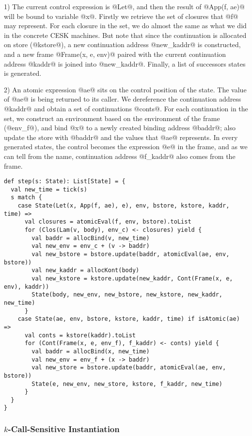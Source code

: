 \documentclass[acmsmall,review,anonymous]{acmart}\settopmatter{printfolios=true,printccs=false,printacmref=false}
\begin{document}
1) The current control expression is @Let@,
and then the result of @App(f, ae)@ will be bound to variable @x@.
Firstly we retrieve the set of closures that @f@ may represent.
For each closure in the set, we do almost the same as what we did in the concrete
CESK machines. But note that since the continuation is allocated on store (@kstore@),
a new continuation address @new_kaddr@ is constructed, and a new frame
@Frame(x, e, env)@ paired with the current continuation address @kaddr@
is joined into @new_kaddr@. Finally, a list of successors states is generated.

2) An atomic expression @ae@ sits on the control position of the state.
The value of @ae@ is being returned to its caller.
We dereference the continuation address @kaddr@ and obtain a set of
continuations @conts@.
For each continuation in the set, we construct an environment based on the
environment of the frame (@env_f@), and bind @x@ to a newly created binding
address @baddr@; also update the store with @baddr@ and
the values that @ae@ represents. In every generated states,
the control becomes the expression @e@ in the frame,
and as we can tell from the name, continuation address @f_kaddr@
also comes from the frame.

\begin{lstlisting}
def step(s: State): List[State] = {
  val new_time = tick(s)
  s match {
    case State(Let(x, App(f, ae), e), env, bstore, kstore, kaddr, time) =>
      val closures = atomicEval(f, env, bstore).toList
      for (Clos(Lam(v, body), env_c) <- closures) yield {
        val baddr = allocBind(v, new_time)
        val new_env = env_c + (v -> baddr)
        val new_bstore = bstore.update(baddr, atomicEval(ae, env, bstore))
        val new_kaddr = allocKont(body)
        val new_kstore = kstore.update(new_kaddr, Cont(Frame(x, e, env), kaddr))
        State(body, new_env, new_bstore, new_kstore, new_kaddr, new_time)
      }
    case State(ae, env, bstore, kstore, kaddr, time) if isAtomic(ae) =>
      val conts = kstore(kaddr).toList
      for (Cont(Frame(x, e, env_f), f_kaddr) <- conts) yield {
        val baddr = allocBind(x, new_time)
        val new_env = env_f + (x -> baddr)
        val new_store = bstore.update(baddr, atomicEval(ae, env, bstore))
        State(e, new_env, new_store, kstore, f_kaddr, new_time)
      }
  }
}
\end{lstlisting}

\subsubsection{$k$-Call-Sensitive Instantiation} \label{kcfainst}
\end{document}

